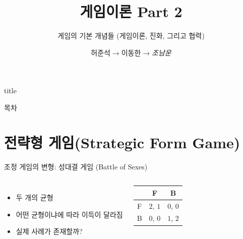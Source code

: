 \documentclass[final]{beamer}
\title{게임이론 Part 2}
\subtitle{게임의 기본 개념들 (게임이론, 진화, 그리고 협력)}
\author[조남운]{허준석$\rightarrow$이동한$\rightarrow$\emph{조남운}\\\mail}
\begin{document}
\begin{frame}[t]{title}
	\titlepage
\end{frame}

\begin{frame}[t]{목차}
	\tableofcontents
\end{frame}

\section{전략형 게임(Strategic Form Game)} %
\label{sec:StrategicForm}

\begin{frame}[t]{조정 게임의 변형: 성대결 게임 (Battle of Sexes)}
	\begin{columns}
		\begin{itemize}
			\item 두 개의 균형
			\item 어떤 균형이냐에 따라 이득이 달라짐
			\item 실제 사례가 존재할까?
		\end{itemize}
		\begin{center}
			\begin{table}
				\setlength{\tabcolsep}{1.2em}
				\begin{tabular}{|c|c|c|} \hline
				& {F} &  {B} \\ \hline
				{F} & {$2$}, {$1$} & {$0$}, {$0$} \\ \hline%
				{B} & {$0$}, {$0$}  & {$1$}, {$2$} \\ 
				\hline
				\end{tabular}
			\end{table}
		\end{center}
	\end{columns}
\end{frame}
\end{document}
